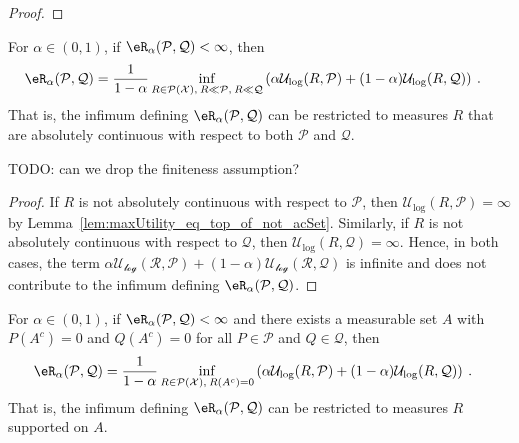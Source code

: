 \begin{proof}\leanok

\end{proof}


\begin{lemma}\label{lem:erenyiDiv_eq_iInf_acSet}
For $\alpha \in (0,1)$, if $\eR_\alpha(\mathcal{P}, \mathcal{Q}) < \infty$, then
\begin{align*}
  \eR_\alpha(\mathcal{P}, \mathcal{Q})
  &= \frac{1}{1 - \alpha} \inf_{R \in \mathcal{P}(\mathcal{X}), \: R \ll \mathcal{P}, \: R \ll \mathcal{Q}} \left( \alpha \mathcal{U}_{\log}(R, \mathcal{P}) + (1 - \alpha) \mathcal{U}_{\log}(R, \mathcal{Q}) \right)
  \: .
\end{align*}
That is, the infimum defining $\eR_\alpha(\mathcal{P}, \mathcal{Q})$ can be restricted to measures $R$ that are absolutely continuous with respect to both $\mathcal{P}$ and $\mathcal{Q}$.

TODO: can we drop the finiteness assumption?
\end{lemma}

\begin{proof}
If $R$ is not absolutely continuous with respect to $\mathcal{P}$, then $\mathcal{U}_{\log}(R, \mathcal{P}) = \infty$ by Lemma~\ref{lem:maxUtility_eq_top_of_not_acSet}.
Similarly, if $R$ is not absolutely continuous with respect to $\mathcal{Q}$, then $\mathcal{U}_{\log}(R, \mathcal{Q}) = \infty$.
Hence, in both cases, the term $\alpha \mathcal{U_{\log}(R, \mathcal{P}) + (1 - \alpha) \mathcal{U}_{\log}(R, \mathcal{Q})}$ is infinite and does not contribute to the infimum defining $\eR_\alpha(\mathcal{P}, \mathcal{Q})$.
\end{proof}


\begin{corollary}\label{cor:erenyiDiv_eq_iInf_support}
For $\alpha \in (0,1)$, if $\eR_\alpha(\mathcal{P}, \mathcal{Q}) < \infty$ and there exists a measurable set $A$ with $P(A^c) = 0$ and $Q(A^c) = 0$ for all $P \in \mathcal{P}$ and $Q \in \mathcal{Q}$, then
\begin{align*}
  \eR_\alpha(\mathcal{P}, \mathcal{Q})
  &= \frac{1}{1 - \alpha} \inf_{R \in \mathcal{P}(\mathcal{X}), \: R(A^c) = 0} \left( \alpha \mathcal{U}_{\log}(R, \mathcal{P}) + (1 - \alpha) \mathcal{U}_{\log}(R, \mathcal{Q}) \right)
  \: .
\end{align*}
That is, the infimum defining $\eR_\alpha(\mathcal{P}, \mathcal{Q})$ can be restricted to measures $R$ supported on $A$.
\end{corollary}

